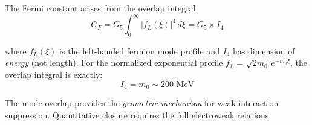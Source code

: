 \begin{remark}
The Fermi constant arises from the overlap integral:
\begin{equation}
G_F = G_5 \int_0^\infty |f_L(\xi)|^4 \, d\xi = G_5 \times I_4
\end{equation}

where $f_L(\xi)$ is the left-handed fermion mode profile and $I_4$ has dimension
of \emph{energy} (not length). For the normalized exponential profile
$f_L = \sqrt{2m_0}\,e^{-m_0\xi}$, the overlap integral is exactly:
\begin{equation}
I_4 = m_0 \sim 200 \text{ MeV}
\label{eq:ch3_I4_remark}
\end{equation}

The mode overlap provides the \emph{geometric mechanism} for weak interaction
suppression. Quantitative closure requires the full electroweak relations.
\end{remark}

